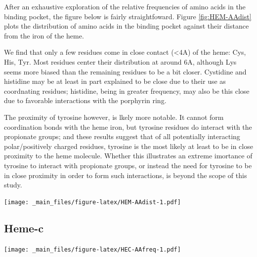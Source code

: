 \documentclass[a4paper, nobind]{templates/ociamthesis}
\let\origfigure\figure
\let\endorigfigure\endfigure
\renewenvironment{figure}[1][2] {
    \expandafter\origfigure\expandafter[H]
} {
    \endorigfigure
}
\begin{document}
After an exhaustive exploration of the relative frequencies of amino acids in the binding pocket, the figure below is fairly straightfoward. Figure \ref{fig:HEM-AAdist} plots the distribution of amino acids in the binding pocket against their distance from the iron of the heme.

We find that only a few residues come in close contact (\textless4A) of the heme: Cys, His, Tyr. Most residues center their distribution at around 6A, although Lys seems more biased than the remaining residues to be a bit closer. Cystidine and histidine may be at least in part explained to be close due to their use as coordnating residues; histidine, being in greater frequency, may also be this close due to favorable interactions with the porphyrin ring.

The proximity of tyrosine however, is lkely more notable. It cannot form coordination bonds with the heme iron, but tyrosine residues do interact with the propionate groups; and these results suggest that of all potentially interacting polar/positively charged residues, tyrosine is the most likely at least to be in close proximity to the heme molecule. Whether this illustrates an extreme imortance of tyrosine to interact with propionate groups, or instead the need for tyrosine to be in close proximity in order to form such interactions, is beyond the scope of this study.

\begin{figure}
\centering
\texttt{[image: \_main\_files/figure-latex/HEM-AAdist-1.pdf]}
\caption{\label{fig:HEM-AAdist}HEM: AA Distances}
\end{figure}

\hypertarget{heme-c}{%
\subsection{Heme-c}\label{heme-c}}

\begin{figure}
\centering
\texttt{[image: \_main\_files/figure-latex/HEC-AAfreq-1.pdf]}
\caption{\label{fig:HEC-AAfreq}HEC: AA Frequency}
\end{figure}
\end{document}
